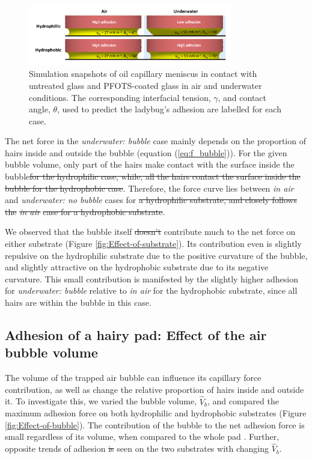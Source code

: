 \documentclass[vruler,JEB]{COB}%
\providecommand{\DIFadd}[1]{{\protect\color{blue}\uwave{#1}}} %
\providecommand{\DIFdel}[1]{{\protect\color{red}\sout{#1}}}                      %
\providecommand{\DIFaddbegin}{} %
\providecommand{\DIFaddend}{} %
\providecommand{\DIFdelbegin}{} %
\providecommand{\DIFdelend}{} %
\begin{document}
\begin{figure}
\includegraphics[width=3.5in]{Figure-8-contact_angle_schematic}\caption{\label{fig:Oil-contact-images}Simulation snapshots of oil capillary
meniscus in contact with untreated glass and PFOTS-coated glass in air and underwater conditions.
The corresponding interfacial tension, $\gamma$, and contact
angle, $\theta$, used to predict the ladybug's adhesion
are labelled for each case.}
\end{figure}

The net force in the \emph{underwater: bubble} case mainly depends
on the proportion of hairs inside and outside the bubble (equation
(\ref{eq:f_bubble})). For the given bubble volume, only part of the
hairs make contact with the surface inside the bubble\DIFdelbegin \DIFdel{for the hydrophilic case, while,
all the hairs contact the surface inside the bubble for the hydrophobic case}\DIFdelend .
Therefore, the force curve lies between \emph{in air} and \emph{underwater:
no bubble} cases for \DIFdelbegin \DIFdel{a hydrophilic substrate, and closely follows
the }\emph{\DIFdel{in air}} %
\DIFdel{case for a hydrophobic substrate}\DIFdelend \DIFaddbegin \DIFadd{both substrates}\DIFaddend .

We observed that the bubble itself \DIFdelbegin \DIFdel{doesn't }\DIFdelend \DIFaddbegin \DIFadd{does not }\DIFaddend contribute much to the net force
on either substrate (Figure \ref{fig:Effect-of-substrate}). Its contribution
even is slightly repulsive on the hydrophilic substrate due to the
positive curvature of the bubble, and slightly attractive on the hydrophobic
substrate due to its negative curvature. This small contribution is
manifested by the slightly higher adhesion for \emph{underwater: bubble}
relative to \emph{in air} for the hydrophobic substrate, since all
hairs are within the bubble in this case.

\subsection{Adhesion of a hairy pad: Effect of the air bubble volume}

The volume of the trapped air bubble can influence its capillary force contribution,
as well as change the relative proportion of hairs inside and outside
it. To investigate this, we varied the bubble volume, \DIFdelbegin \DIFdel{$\hat{V}_{b}$}\DIFdelend \DIFaddbegin \DIFadd{$V_{b}$}\DIFaddend ,
and compared the maximum adhesion force on both hydrophilic and hydrophobic
substrates (Figure \ref{fig:Effect-of-bubble}). The contribution
of the bubble to the net adhesion force is small regardless of its
volume, when compared to the whole pad \DIFaddbegin \DIFadd{(less than 3 \%)}\DIFaddend . Further, opposite trends of
adhesion \DIFdelbegin \DIFdel{is }\DIFdelend \DIFaddbegin \DIFadd{are }\DIFaddend seen on the two substrates with changing \DIFdelbegin \DIFdel{$\hat{V}_{b}$}\DIFdelend \DIFaddbegin \DIFadd{$V_{b}$}\DIFaddend .
\end{document}
